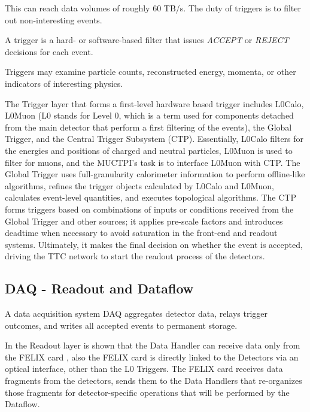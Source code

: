 This can reach data volumes of roughly 60 TB/s. The duty of triggers is to filter out non-interesting events.

\begin{definition}
\label{def:trigger}
A trigger is a hard- or software-based filter that issues \emph{ACCEPT} or \emph{REJECT} decisions for each event.
\end{definition}

Triggers may examine particle counts, reconstructed energy, momenta, or other indicators of interesting physics.

The Trigger layer that forms a first-level hardware based trigger includes \cite{tdaq} \acs{L0Calo}, \acs{L0Muon} (\acs{L0} stands for Level 0, which is a term used for components detached from the main detector that perform a first filtering of the events), the Global Trigger, and the Central Trigger Subsystem (\acs{CTP}). Essentially, \acs{L0Calo} filters for the energies and positions of charged and neutral particles, \acs{L0Muon} is used to filter for muons, and the \acs{MUCTPI}'s task is to interface \acs{L0Muon} with \acs{CTP}. The Global Trigger \cite{tdaq} uses full-granularity calorimeter information to perform offline-like algorithms, refines the trigger objects calculated by \acs{L0Calo} and \acs{L0Muon}, calculates event-level quantities, and executes topological algorithms. The \acs{CTP} \cite{tdaq} forms triggers based on combinations of inputs or conditions received from the Global Trigger and other sources; it applies pre-scale factors and introduces deadtime when necessary to avoid saturation in the front-end and readout systems. Ultimately, it makes the final decision on whether the event is accepted, driving the \acs{TTC} network to start the readout process of the detectors.

\subsection{\acs{DAQ} - Readout and Dataflow}

\begin{definition}
\label{def:daq}
A data acquisition system \acs{DAQ} aggregates detector data, relays trigger outcomes, and writes all accepted events to permanent storage.
\end{definition}

In the Readout layer is shown that the Data Handler can receive data only from the \acs{FELIX} card \cite{tdaq}, also the \acs{FELIX} card is directly linked to the Detectors via an optical interface, other than the \acs{L0} Triggers. The \acs{FELIX} card receives data fragments from the detectors, sends them to the Data Handlers that re-organizes those fragments for detector-specific operations that will be performed by the Dataflow.

